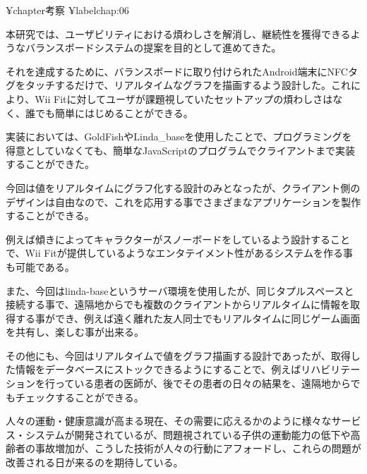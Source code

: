 ¥chapter{考察}
¥label{chap:06}


本研究では、ユーザビリティにおける煩わしさを解消し、継続性を獲得できるようなバランスボードシステムの提案を目的として進めてきた。

それを達成するために、バランスボードに取り付けられたAndroid端末にNFCタグをタッチするだけで、リアルタイムなグラフを描画するよう設計した。これにより、Wii Fitに対してユーザが課題視していたセットアップの煩わしさはなく、誰でも簡単にはじめることができる。

実装においては、GoldFishやLinda_baseを使用したことで、プログラミングを得意としていなくても、簡単なJavaScriptのプログラムでクライアントまで実装することができた。

今回は値をリアルタイムにグラフ化する設計のみとなったが、クライアント側のデザインは自由なので、これを応用する事でさまざまなアプリケーションを製作することができる。

例えば傾きによってキャラクターがスノーボードをしているよう設計することで、Wii Fitが提供しているようなエンタテイメント性があるシステムを作る事も可能である。

また、今回はlinda-baseというサーバ環境を使用したが、同じタプルスペースと接続する事で、遠隔地からでも複数のクライアントからリアルタイムに情報を取得する事ができ、例えば遠く離れた友人同士でもリアルタイムに同じゲーム画面を共有し、楽しむ事が出来る。

その他にも、今回はリアルタイムで値をグラフ描画する設計であったが、取得した情報をデータベースにストックできるようにすることで、例えばリハビリテーションを行っている患者の医師が、後でその患者の日々の結果を、遠隔地からでもチェックすることができる。

人々の運動・健康意識が高まる現在、その需要に応えるかのように様々なサービス・システムが開発されているが、問題視されている子供の運動能力の低下や高齢者の事故増加が、こうした技術が人々の行動にアフォードし、これらの問題が改善される日が来るのを期待している。

